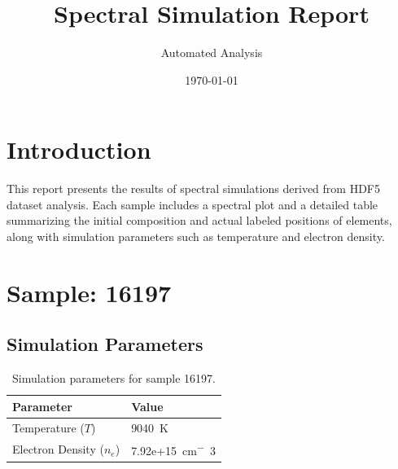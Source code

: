 \documentclass[a4paper,11pt]{article}
\title{Spectral Simulation Report}
\author{Automated Analysis}
\date{\today}
\begin{document}
\maketitle
\tableofcontents
\clearpage

\section{Introduction}
This report presents the results of spectral simulations derived from HDF5 dataset analysis. Each sample includes a spectral plot and a detailed table summarizing the initial composition and actual labeled positions of elements, along with simulation parameters such as temperature and electron density.


\section{Sample: 16197}
\subsection{Simulation Parameters}
\begin{table}[h!]
    \centering
    \begin{tabular}{ll}
        \toprule
        \textbf{Parameter} & \textbf{Value} \\
        \midrule
        Temperature ($T$) & 9040 \,\si{K} \\
        Electron Density ($n_e$) & 7.92e+15 \,\si{cm^-3} \\
        \bottomrule
    \end{tabular}
    \caption{Simulation parameters for sample 16197.}
    \label{tab:params_16197}
\end{table}
\end{document}
